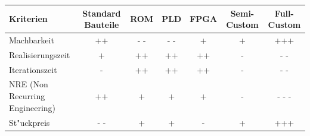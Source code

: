 \begin{tabular}{|l|c|c|c|c|c|c|}
	\hline
	Kriterien & Standard Bauteile & ROM & PLD & FPGA & Semi-Custom & Full-Custom \\
	\hline
	Machbarkeit & ++ & - - & - - & + & + & +++ \\
	\hline
	Realisierungszeit & + & ++ & ++ & ++ & - & - - \\
	\hline
	Iterationszeit & - & ++ & ++ & ++ & - & - - \\
	\hline
	NRE (Non Recurring Engineering) & ++ & + & + & + & - & - - -\\
	\hline
	St"uckpreis & - - & + & + & - & + & +++ \\
	\hline
\end{tabular}
	